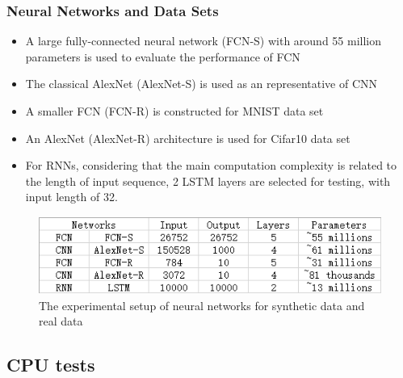 
\begin{frame}
  \MyLogo
  \frametitle{Neural Networks and Data Sets}  

\medskip

\begin{itemize}

\item A large fully-connected neural network (\alert{FCN-S}) with around 55 million parameters is used to evaluate the performance of FCN

\item The classical AlexNet (\alert{AlexNet-S}) is used as an representative of CNN

\item A smaller FCN (\alert{FCN-R}) is constructed for MNIST data set

\item An AlexNet (\alert{AlexNet-R}) architecture is used for Cifar10 data set

\item For RNNs, considering that the main computation complexity is related to the length of input sequence, 2 LSTM layers are selected for testing, with input length of 32.

\end{itemize}

\begin{figure}[htbp] 
\includegraphics[height=1in]{figures/models.png} 
\caption{The experimental setup of neural networks for synthetic data and real data}
\end{figure}
	
\end{frame}

\subsection{CPU tests}

